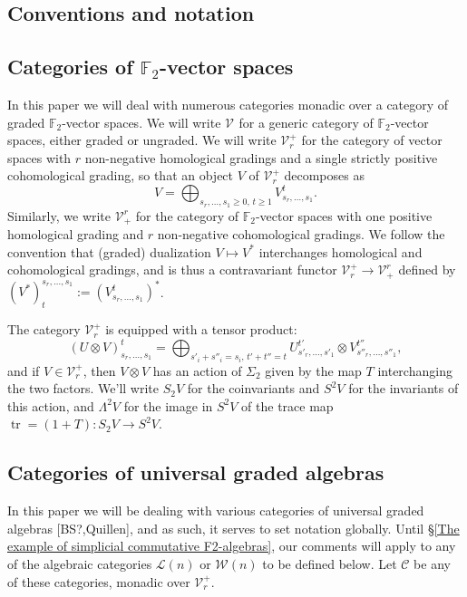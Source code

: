 \documentclass[11pt]{amsart}
\theoremstyle{plain}
\theoremstyle{definition}
\DeclareMathOperator{\trace}{tr}
\renewcommand{\to}{\longrightarrow}
\newcommand{\calW}{\mathcal{W}}
\newcommand{\calL}{\mathcal{L}}
\newcommand{\calC}{\mathcal{C}}
\newcommand{\calV}{\mathcal{V}}
\theoremstyle{plain}
\newcommand{\vect}[2]{\calV^{#1}_{#2}}
\newcommand{\F}{\mathbb{F}}
\begin{document}
\begin{Conventions and notation}
\section{Conventions and notation}
\subsection{Categories of $\F_2$-vector spaces}

In this paper we will deal with numerous categories monadic over a category of graded $\F_2$-vector spaces. We will write $\vect{}{}$ for a generic category of $\F_2$-vector spaces, either graded or ungraded. We will write $\vect{+}{r}$ for the category of vector spaces with $r$ non-negative homological gradings and a single strictly positive cohomological grading, so that an object $V$ of $\vect{+}{r}$ decomposes as
\[V=\bigoplus_{s_r,\ldots,s_1\geq0,\,t\geq 1}V^{t}_{s_r,\ldots,s_1}.\]
Similarly, we write $\vect{r}{+}$ for the category of $\F_2$-vector spaces with one positive homological grading and $r$ non-negative cohomological gradings. We follow the convention that (graded) dualization $V\mapsto V^*$ interchanges homological and cohomological gradings, and is thus a contravariant functor $\vect{+}{r}\to\vect{r}{+}$ defined by $(V^*)^{s_r,\ldots,s_1}_{t}:=(V_{s_r,\ldots,s_1}^{t})^*$.

The category $\vect{+}{r}$ is equipped with a tensor product:
\[(U\otimes V)^t_{s_r,\ldots,s_1}=\bigoplus_{s'_i+s''_i=s_i,\,t'+t''=t}U^{t'}_{s'_r,\ldots,s'_1}\otimes V^{t''}_{s''_r,\ldots,s''_1},\]
and if $V\in \vect{+}{r}$, then $V\otimes V$ has an action of $\Sigma_2$ given by the map $T$ interchanging the two factors. We'll write $S_2V$ for the coinvariants and $S^2V$ for the invariants of this action, and $\Lambda^2V$ for the image in $S^2V$ of the trace map $\trace=(1+T):S_2V\to S^2V$.

\subsection{Categories of universal graded algebras}
In this paper we will be dealing with various categories of universal graded algebras [BS?,Quillen], and as such, it serves to set notation globally. Until \S\ref{The example of simplicial commutative F2-algebras}, our comments will apply to any of the algebraic categories $\calL(n)$ or $\calW(n)$ to be defined below. Let $\calC$ be any of these categories, monadic over $\vect{+}{r}$.


\end{Conventions and notation}
\end{document}
